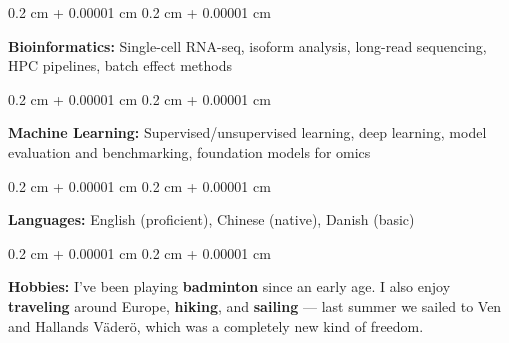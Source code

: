 \documentclass[10pt, letterpaper]{article}
\newenvironment{onecolentry}{
    \begin{adjustwidth}{
        0.2 cm + 0.00001 cm
    }{
        0.2 cm + 0.00001 cm
    }
}{
    \end{adjustwidth}
} %
\begin{document}
        \begin{onecolentry}
            \textbf{Bioinformatics:} Single-cell RNA-seq, isoform analysis, long-read sequencing, HPC pipelines, batch effect methods
        \end{onecolentry}

        \vspace{0.2 cm}

        \begin{onecolentry}
            \textbf{Machine Learning:} Supervised/unsupervised learning, deep learning, model evaluation and benchmarking, foundation models for omics
        \end{onecolentry}

        \vspace{0.2 cm}

        \begin{onecolentry}
            \textbf{Languages:} English (proficient), Chinese (native), Danish (basic)
        \end{onecolentry}

        \vspace{0.2 cm}

        \begin{onecolentry}
            \textbf{Hobbies:}
            I've been playing \textbf{badminton} since an early age. I also enjoy \textbf{traveling} around Europe, \textbf{hiking}, and \textbf{sailing} — last summer we sailed to Ven and Hallands Väderö, which was a completely new kind of freedom.
        \end{onecolentry}
\end{document}
